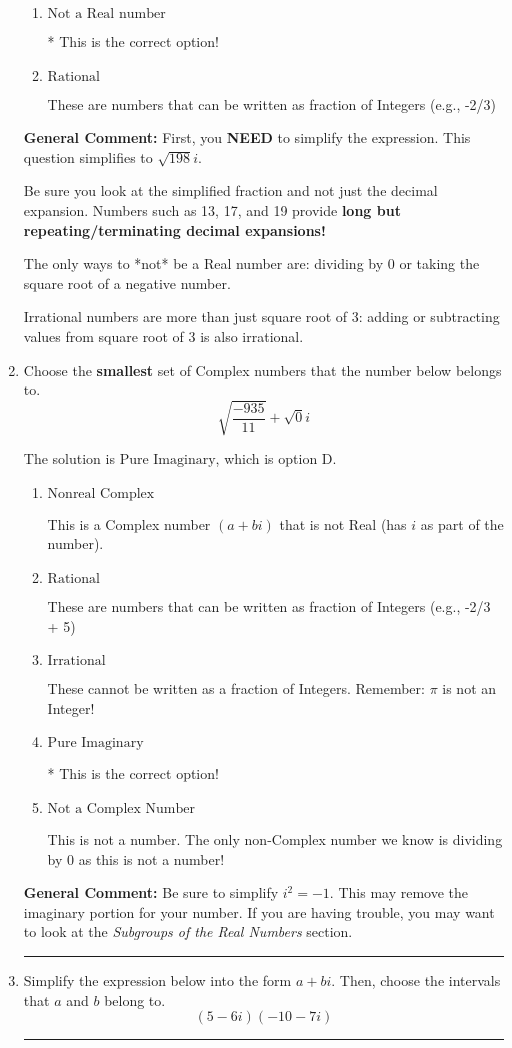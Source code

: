 \documentclass{extbook}[14pt]
\newcommand{\litem}[1]{\item #1

\rule{\textwidth}{0.4pt}}
\begin{document}
\begin{enumerate}
{\begin{enumerate}[label=\Alph*.]
These are the negative and positive counting numbers (..., -3, -2, -1, 0, 1, 2, 3, ...)
\item \( \text{Not a Real number} \)

* This is the correct option!
\item \( \text{Rational} \)

These are numbers that can be written as fraction of Integers (e.g., -2/3)
\end{enumerate}

\textbf{General Comment:} First, you \textbf{NEED} to simplify the expression. This question simplifies to $\sqrt{198} i$. 
 
 Be sure you look at the simplified fraction and not just the decimal expansion. Numbers such as 13, 17, and 19 provide \textbf{long but repeating/terminating decimal expansions!} 
 
 The only ways to *not* be a Real number are: dividing by 0 or taking the square root of a negative number. 
 
 Irrational numbers are more than just square root of 3: adding or subtracting values from square root of 3 is also irrational.
}
\litem{
Choose the \textbf{smallest} set of Complex numbers that the number below belongs to.
\[ \sqrt{\frac{-935}{11}}+\sqrt{0}i \]

The solution is \( \text{Pure Imaginary} \), which is option D.\begin{enumerate}[label=\Alph*.]
\item \( \text{Nonreal Complex} \)

This is a Complex number $(a+bi)$ that is not Real (has $i$ as part of the number).
\item \( \text{Rational} \)

These are numbers that can be written as fraction of Integers (e.g., -2/3 + 5)
\item \( \text{Irrational} \)

These cannot be written as a fraction of Integers. Remember: $\pi$ is not an Integer!
\item \( \text{Pure Imaginary} \)

* This is the correct option!
\item \( \text{Not a Complex Number} \)

This is not a number. The only non-Complex number we know is dividing by 0 as this is not a number!
\end{enumerate}

\textbf{General Comment:} Be sure to simplify $i^2 = -1$. This may remove the imaginary portion for your number. If you are having trouble, you may want to look at the \textit{Subgroups of the Real Numbers} section.
}
\litem{
Simplify the expression below into the form $a+bi$. Then, choose the intervals that $a$ and $b$ belong to.
\[ (5 - 6 i)(-10 - 7 i) \]

}
\end{enumerate}
\end{document}

